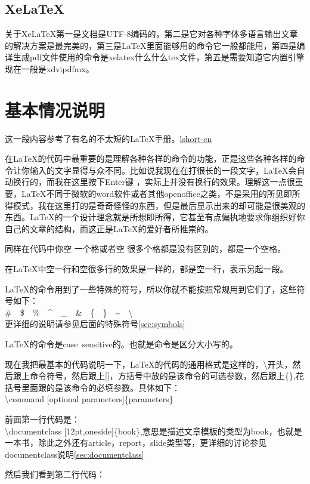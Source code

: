 \documentclass[11pt,oneside]{book}
\begin{document}
\begin{common-format}
\subsection{XeLaTeX}
关于XeLaTeX第一是文档是UTF-8编码的，第二是它对各种字体多语言输出文章的解决方案是最完美的，第三是LaTeX里面能够用的命令它一般都能用，第四是编译生成pdf文件使用的命令是xelatex什么什么tex文件，第五是需要知道它内置引擎现在一般是xdvipdfmx。


\section{基本情况说明}
这一段内容参考了有名的不太短的LaTeX手册。\href{http://www.ctan.org/pkg/lshort-zh-cn}{lshort-cn}

在\LaTeX 的代码中最重要的是理解各种各样的命令的功能，正是这些各种各样的命令让你输入的文字显得与众不同。比如说我现在在打很长的一段文字，\LaTeX 会自动换行的，而我在这里按下Enter键
，实际上并没有换行的效果。理解这一点很重要，\LaTeX 不同于微软的word软件或者其他openoffice之类，不是采用的所见即所得模式，我在这里打的是奇奇怪怪的东西，但是最后显示出来的却可能是很美观的东西。\LaTeX 的一个设计理念就是所想即所得，它甚至有点偏执地要求你组织好你自己的文章的结构，而这正是\LaTeX 的爱好者所推崇的。

同样在代码中你空 一个格或者空      很多个格都是没有区别的，都是一个空格。

在\LaTeX 中空一行和空很多行的效果是一样的，都是空一行，表示另起一段。

\LaTeX 的命令用到了一些特殊的符号，所以你就不能按照常规用到它们了，这些符号如下：\\
\#~~\$~~\%~~\^~~\_~~\&~~\{~~\}~~\~~~\textbackslash \\
更详细的说明请参见后面的特殊符号\ref{sec:symbols}

\LaTeX 的命令是case~sensitive的。也就是命令是区分大小写的。

现在我把最基本的代码说明一下，\LaTeX 的代码的通用格式是这样的，\textbackslash 开头，然后跟上命令符号，然后跟上[]，方括号中放的是该命令的可选参数，然后跟上\{\},花括号里面跟的是该命令的必填参数。具体如下：\\
\textbackslash command [optional parameters]\{parameters\}

前面第一行代码是：\\
\textbackslash documentclass [12pt,oneside]\{book\},意思是描述文章模板的类型为book，也就是一本书，除此之外还有article，report，slide类型等，更详细的讨论参见documentclass说明\ref{sec:documentclass}

然后我们看到第二行代码：


\end{common-format}
\end{document}
